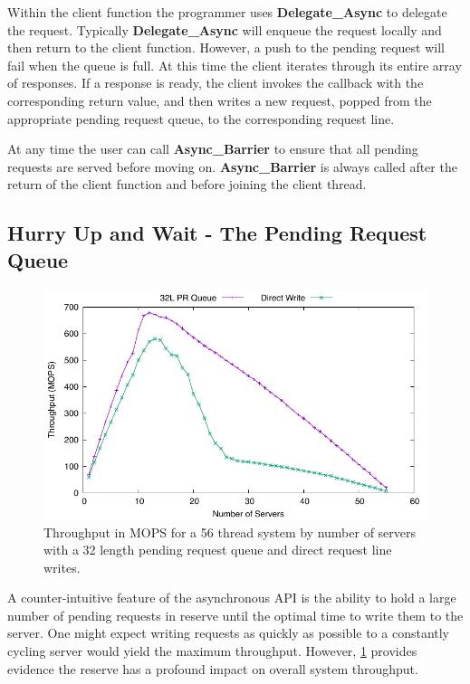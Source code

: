 \documentclass{uicthesi}
\begin{document}
Within the client function the programmer uses \textbf{Delegate\_Async} to delegate the request. Typically \textbf{Delegate\_Async} will enqueue the request locally and then return to the client function. However, a push to the pending request will fail when the queue is full. At this time the client iterates through its entire array of responses. If a response is ready, the client invokes the callback with the corresponding return value, and then writes a new request, popped from the appropriate pending request queue, to the corresponding request line. 

At any time the user can call \textbf{Async\_Barrier} to ensure that all pending requests are served before moving on.  \textbf{Async\_Barrier} is always called after the return of the client function and before joining the client thread. 

\subsection{Hurry Up and Wait - The Pending Request Queue} \label{pr}
\begin{figure}[ht!]
\centering
\includegraphics[width=0.9\columnwidth]{FIG/queue_v_no_queue.pdf}
\caption{Throughput in MOPS for a 56 thread system by number of servers with a 32 length pending request queue and direct request line writes.}
\label{fig:queue_v_no_queue}
\end{figure}

A counter-intuitive feature of the asynchronous API is the ability to hold a large number of pending requests in reserve until the optimal time to write them to the server. One might expect writing requests as quickly as possible to a constantly cycling server would yield the maximum throughput. However, \ref{fig:queue_v_no_queue} provides evidence the reserve has a profound impact on overall system throughput. 
\end{document}
